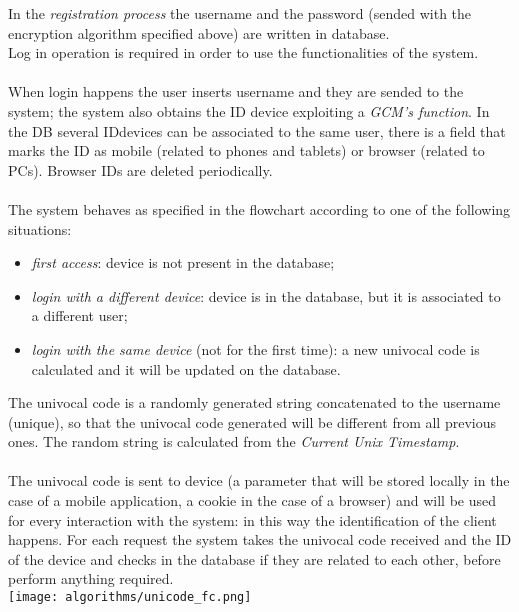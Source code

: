 In the \textit{registration process} the username and the password (sended with the encryption algorithm specified above) are written in database.\\
Log in operation is required in order to use the functionalities of the system.
\\\\
When login happens the user inserts username and they are sended to the system; the system also obtains the ID device exploiting a \textit{GCM's function}. In the DB several IDdevices can be associated to the same user, there is a field that marks the ID as mobile (related to phones and tablets) or browser (related to PCs). Browser IDs are deleted periodically. 
\\\\
The system behaves as specified in the flowchart according to one of the following situations:
\begin{itemize}
\item \textit{first access}: device is not present in the database;
\item \textit{login with a different device}: device is in the database, but it is associated to a different user;
\item \textit{login with the same device} (not for the first time): a new univocal code is calculated and it will be updated on the database.
\end{itemize}
The univocal code is a randomly generated string concatenated to the username (unique), so that the univocal code generated will be different from all previous ones. The random string is calculated from the \textit{Current Unix Timestamp}.
\\\\
The univocal code is sent to device (a parameter that will be stored locally in the case of a mobile application, a cookie in the case of a browser) and will be used for every interaction with the system: in this way the identification of the client happens. For each request the system takes the univocal code received and the ID of the device and checks in the database if they are related to each other, before perform anything required. 
\\
\texttt{[image: algorithms/unicode\_fc.png]}
\\
